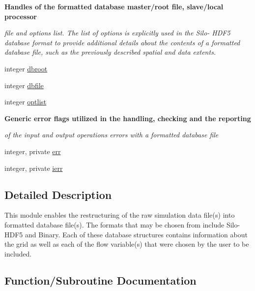 \begin{Indent}\textbf{ Handles of the formatted database master/root file, slave/local processor}\par
{\em file and options list. The list of options is explicitly used in the Silo-\/ H\+D\+F5 database format to provide additional details about the contents of a formatted database file, such as the previously described spatial and data extents. }\begin{DoxyCompactItemize}
\item 
integer \hyperlink{namespacem__data__output_a5cd7e79fd8f57db6362eeae681f8a9d8}{dbroot}
\item 
integer \hyperlink{namespacem__data__output_aec51d3900a580048a3c9f5bddfa38ed2}{dbfile}
\item 
integer \hyperlink{namespacem__data__output_a21c768216c63e43ea9e1f13e498a3558}{optlist}
\end{DoxyCompactItemize}
\end{Indent}
\begin{Indent}\textbf{ Generic error flags utilized in the handling, checking and the reporting}\par
{\em of the input and output operations errors with a formatted database file }\begin{DoxyCompactItemize}
\item 
integer, private \hyperlink{namespacem__data__output_a9200025029de298307a47699927a60fa}{err}
\item 
integer, private \hyperlink{namespacem__data__output_afa88ae36e1e20ff64867261ef6c9be15}{ierr}
\end{DoxyCompactItemize}
\end{Indent}


\subsection{Detailed Description}
This module enables the restructuring of the raw simulation data file(s) into formatted database file(s). The formats that may be chosen from include Silo-\/\+H\+D\+F5 and Binary. Each of these database structures contains information about the grid as well as each of the flow variable(s) that were chosen by the user to be included. 

\subsection{Function/\+Subroutine Documentation}
\mbox{\label{namespacem__data__output_a9ab4e5bfbf085c126a58c78383d38fa7}} 
